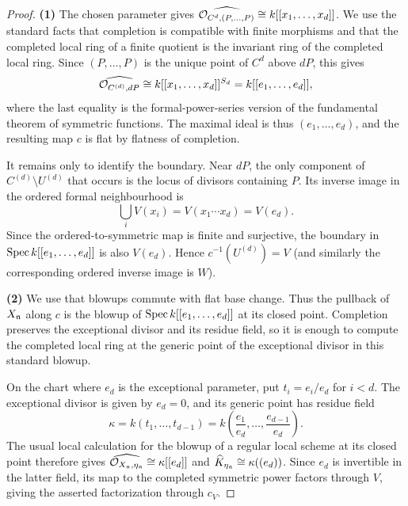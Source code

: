 \begin{proof}
    \textbf{(1)} The chosen parameter gives
    $\widehat{\mathcal{O}_{C^d,(P,\dots,P)}}\cong k[[x_1,\dots,x_d]]$.
    We use the standard facts that completion is compatible with finite
    morphisms and that the completed local ring of a finite quotient is the
    invariant ring of the completed local ring.  Since $(P,\dots,P)$ is the
    unique point of $C^d$ above $dP$, this gives
    \[
        \widehat{\mathcal{O}_{C^{(d)},dP}}
        \cong k[[x_1,\dots,x_d]]^{S_d}
        =k[[e_1,\dots,e_d]],
    \]
    where the last equality is the formal-power-series version of the
    fundamental theorem of symmetric functions.  The maximal ideal is thus
    $(e_1,\dots,e_d)$, and the resulting map $c$ is flat by flatness of
    completion.

    It remains only to identify the boundary.  Near $dP$, the only component
    of $C^{(d)}\setminus U^{(d)}$ that occurs is the locus of divisors
    containing $P$.  Its inverse image in the ordered formal neighbourhood is
    \[
        \bigcup_i V(x_i)=V(x_1\cdots x_d)=V(e_d).
    \]
    Since the ordered-to-symmetric map is finite and surjective, the boundary
    in $\operatorname{Spec} k[[e_1,\dots,e_d]]$ is also $V(e_d)$.  Hence
    $c^{-1}(U^{(d)})=V$ (and similarly the corresponding ordered inverse image
    is $W$).

    \textbf{(2)} We use that blowups commute with flat base change.  Thus the
    pullback of $X_{\mathfrak{n}}$ along $c$ is the blowup of
    $\operatorname{Spec} k[[e_1,\dots,e_d]]$ at its closed point.  Completion preserves the
    exceptional divisor and its residue field, so it is enough to compute the
    completed local ring at the generic point of the exceptional divisor in
    this standard blowup.

    On the chart where $e_d$ is the exceptional parameter, put
    $t_i=e_i/e_d$ for $i<d$.  The exceptional divisor is given by $e_d=0$,
    and its generic point has residue field
    \[
        \kappa=k(t_1,\dots,t_{d-1})
        =k\left(\frac{e_1}{e_d},\dots,\frac{e_{d-1}}{e_d}\right).
    \]
    The usual local calculation for the blowup of a regular local scheme at
    its closed point therefore gives
    $\widehat{\mathcal{O}_{X_{\mathfrak{n}},\eta_{\mathfrak{n}}}}\cong\kappa[[e_d]]$ and
    $\widehat K_{\eta_{\mathfrak{n}}}\cong\kappa((e_d))$.  Since $e_d$ is invertible
    in the latter field, its map to the completed symmetric power factors
    through $V$, giving the asserted factorization through $c_V$.


\end{proof}
